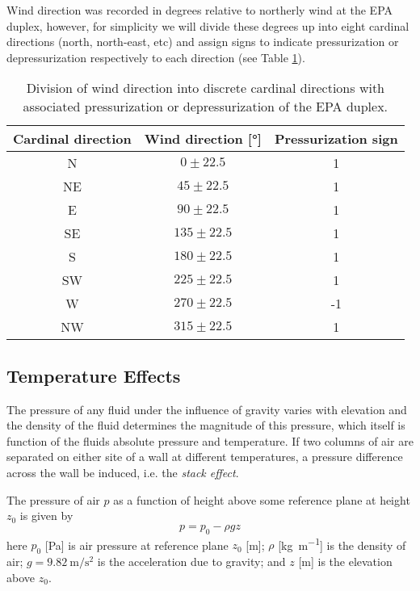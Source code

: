 Wind direction was recorded in degrees relative to northerly wind at the EPA duplex, however, for simplicity we will divide these degrees up into eight cardinal directions (north, north-east, etc) and assign signs to indicate pressurization or depressurization respectively to each direction (see Table \ref{tbl:wind_direction}).\par

\begin{table}[htb!]
  \centering
  \begin{tabular}{c c c}
    \toprule
    Cardinal direction & Wind direction [\si{\degree}] & Pressurization sign \\
    \midrule
    N & $0 \pm 22.5$ & 1 \\
    NE & $45 \pm 22.5$ & 1 \\
    E & $90 \pm 22.5$ & 1 \\
    SE & $135 \pm 22.5$ & 1 \\
    S & $180 \pm 22.5$ & 1 \\
    SW & $225 \pm 22.5$ & 1 \\
    W & $270 \pm 22.5$ & -1 \\
    NW & $315 \pm 22.5$ & 1 \\
    \bottomrule
  \end{tabular}
  \caption{Division of wind direction into discrete cardinal directions with associated pressurization or depressurization of the EPA duplex.}
  \label{tbl:wind_direction}
\end{table}

\subsection{Temperature Effects}

The pressure of any fluid under the influence of gravity varies with elevation and the density of the fluid determines the magnitude of this pressure, which itself is function of the fluids absolute pressure and temperature.
If two columns of air are separated on either site of a wall at different temperatures, a pressure difference across the wall be induced, i.e. the \textit{stack effect}.\par

The pressure of air $p$ as a function of height above some reference plane at height $z_0$ is given by
\begin{equation}
  p = p_0 - \rho g z
\end{equation}
here $p_0$ [\si{\pascal}] is air pressure at reference plane $z_0$ [\si{\metre}];
$\rho$ [\si{\kilo\gram\per\metre}] is the density of air;
$g = \SI{9.82}{\metre\per\second\squared}$ is the acceleration due to gravity;
and $z$ [\si{\metre}] is the elevation above $z_0$.\par

